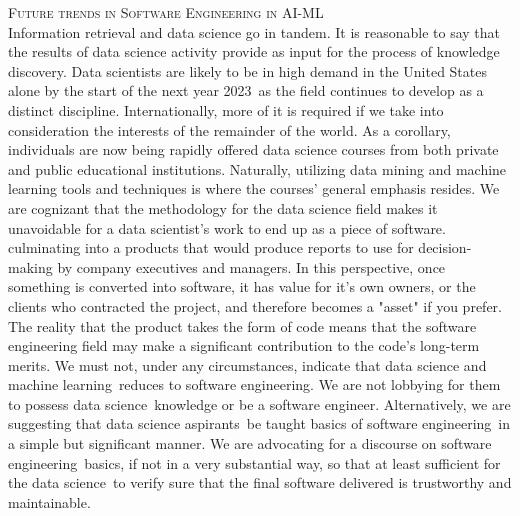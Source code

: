 \documentclass[12pt,a4paper]{article}
\begin{document}
\noindent \textsc{Future trends in Software Engineering in AI-ML} \\
Information retrieval and data science go in tandem. It is reasonable to say that the results of data science activity provide as input for the process of knowledge discovery. Data scientists are likely to be in high demand in the United States alone by the start of the next year 2023 as the field continues to develop as a distinct discipline. Internationally, more of it is required if we take into consideration the interests of the remainder of the world. As a corollary, individuals are now being rapidly offered data science courses from both private and public educational institutions. Naturally, utilizing data mining and machine learning tools and techniques is where the courses' general emphasis resides. We are cognizant that the methodology for the data science field makes it unavoidable for a data scientist's work to end up as a piece of software. culminating into a products that would produce reports to use for decision-making by company executives and managers. In this perspective, once something is converted into software, it has value for it's own owners, or the clients who contracted the project, and therefore becomes a "asset" if you prefer. The reality that the product takes the form of code means that the software engineering field may make a significant contribution to the code's long-term merits. We must not, under any circumstances, indicate that data science and machine learning reduces to software engineering. We are not lobbying for them to possess data science knowledge or be a software engineer. Alternatively, we are suggesting that data science aspirants be taught basics of software engineering in a simple but significant manner. We are advocating for a discourse on software engineering basics, if not in a very substantial way, so that at least sufficient for the data science to verify sure that the final software delivered is trustworthy and maintainable.




%
%
\end{document}
